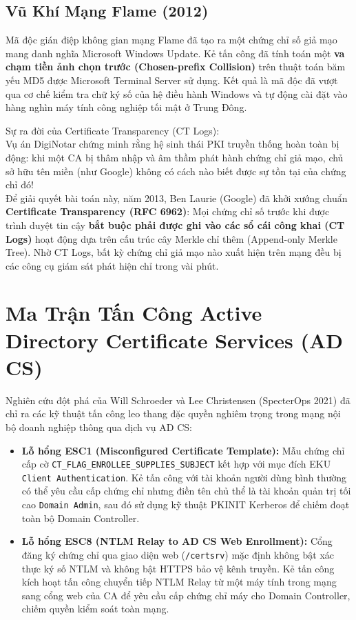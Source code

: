 \subsection{Vũ Khí Mạng Flame (2012)}

Mã độc gián điệp không gian mạng Flame đã tạo ra một chứng chỉ số giả mạo mang danh nghĩa Microsoft Windows Update. Kẻ tấn công đã tính toán một \textbf{va chạm tiền ảnh chọn trước (Chosen-prefix Collision)} trên thuật toán băm yếu MD5 được Microsoft Terminal Server sử dụng. Kết quả là mã độc đã vượt qua cơ chế kiểm tra chữ ký số của hệ điều hành Windows và tự động cài đặt vào hàng nghìn máy tính công nghiệp tối mật ở Trung Đông.

\begin{batngo}
Sự ra đời của Certificate Transparency (CT Logs):\\
Vụ án DigiNotar chứng minh rằng hệ sinh thái PKI truyền thống hoàn toàn bị động: khi một CA bị thâm nhập và âm thầm phát hành chứng chỉ giả mạo, chủ sở hữu tên miền (như Google) không có cách nào biết được sự tồn tại của chứng chỉ đó!\\
Để giải quyết bài toán này, năm 2013, Ben Laurie (Google) đã khởi xướng chuẩn \textbf{Certificate Transparency (RFC 6962)}: Mọi chứng chỉ số trước khi được trình duyệt tin cậy \textbf{bắt buộc phải được ghi vào các sổ cái công khai (CT Logs)} hoạt động dựa trên cấu trúc cây Merkle chỉ thêm (Append-only Merkle Tree). Nhờ CT Logs, bất kỳ chứng chỉ giả mạo nào xuất hiện trên mạng đều bị các công cụ giám sát phát hiện chỉ trong vài phút.
\end{batngo}

\section{Ma Trận Tấn Công Active Directory Certificate Services (AD CS)}

Nghiên cứu đột phá của Will Schroeder và Lee Christensen (SpecterOps 2021) đã chỉ ra các kỹ thuật tấn công leo thang đặc quyền nghiêm trọng trong mạng nội bộ doanh nghiệp thông qua dịch vụ AD CS:
\begin{itemize}
  \item \textbf{Lỗ hổng ESC1 (Misconfigured Certificate Template):} Mẫu chứng chỉ cấp cờ \texttt{CT\_FLAG\_ENROLLEE\_SUPPLIES\_SUBJECT} kết hợp với mục đích EKU \texttt{Client Authentication}. Kẻ tấn công với tài khoản người dùng bình thường có thể yêu cầu cấp chứng chỉ nhưng điền tên chủ thể là tài khoản quản trị tối cao \texttt{Domain Admin}, sau đó sử dụng kỹ thuật PKINIT Kerberos để chiếm đoạt toàn bộ Domain Controller.
  \item \textbf{Lỗ hổng ESC8 (NTLM Relay to AD CS Web Enrollment):} Cổng đăng ký chứng chỉ qua giao diện web (\texttt{/certsrv}) mặc định không bật xác thực ký số NTLM và không bật HTTPS bảo vệ kênh truyền. Kẻ tấn công kích hoạt tấn công chuyển tiếp NTLM Relay từ một máy tính trong mạng sang cổng web của CA để yêu cầu cấp chứng chỉ máy cho Domain Controller, chiếm quyền kiểm soát toàn mạng.
\end{itemize}

